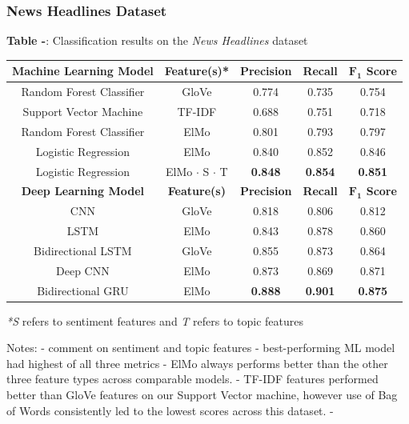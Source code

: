 \documentclass[12pt,a4paper]{article}
\begin{document}
\subsubsection{News Headlines Dataset}
\begin{center}
	\textbf{Table -}: Classification results on the \textit{News Headlines} dataset
\end{center}

\begin{center}
	\begin{tabular}{ |c||c|c|c|c|}
		\hline
		\textbf{Machine Learning Model}& \textbf{Feature(s)*} & \textbf{Precision} & \textbf{Recall} & \textbf{$\mathbf{F_1}$ Score}\\
		\hline\hline
		Random Forest Classifier & GloVe  & 0.774   & 0.735 & 0.754\\
		Support Vector Machine & TF-IDF  & 0.688   & 0.751 & 0.718\\
		Random Forest Classifier & ElMo  & 0.801   & 0.793 & 0.797\\
		Logistic Regression & ElMo  & 0.840   & 0.852 & 0.846\\
		Logistic Regression & ElMo $\cdot$ S $\cdot$ T & \textbf{0.848}   & \textbf{0.854} & \textbf{0.851}\\
		\hline\hline
		\textbf{Deep Learning Model}& \textbf{Feature(s)} & \textbf{Precision} & \textbf{Recall} & \textbf{$\mathbf{F_1}$ Score}\\
		\hline
		CNN & GloVe  & 0.818 & 0.806 & 0.812\\
		LSTM & ElMo  & 0.843   & 0.878 & 0.860\\
		Bidirectional LSTM & GloVe  & 0.855   & 0.873 & 0.864\\
		Deep CNN & ElMo & 0.873   & 0.869 & 0.871\\
		Bidirectional GRU & ElMo  & \textbf{0.888}   & \textbf{0.901} & \textbf{0.875}\\
		\hline
	\end{tabular}
\end{center}
\textit{*S} refers to sentiment features and \textit{T} refers to topic features\\\vspace{-10pt}


Notes:
- comment on sentiment and topic features
- best-performing ML model had highest of all three metrics
- ElMo always performs better than the other three feature types across comparable models.
- TF-IDF features performed better than GloVe features on our Support Vector machine, however use of Bag of Words consistently led to the lowest scores across this dataset.
- 
\end{document}

